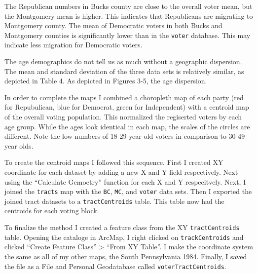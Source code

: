 \documentclass[]{article}
\begin{document}
The Republican numbers in Bucks county are close to the overall voter
mean, but the Montgomery mean is higher. This indicates that Republicans
are migrating to Montgomery county. The mean of Democratic voters in
both Bucks and Montgomery counties is significantly lower than in the
\texttt{voter} database. This may indicate less migration for Democratic
voters.

The age demographics do not tell us as much without a geographic
dispersion. The mean and standard deviation of the three data sets is
relatively similar, as depicted in Table 4. As depicted in Figures 3-5,
the age dispersion.

In order to complete the maps I combined a choropleth map of each party
(red for Repubulican, blue for Democrat, green for Independent) with a
centroid map of the overall voting population. This normalized the
regiserted voters by each age group. While the ages look identical in
each map, the scales of the circles are different. Note the low numbers
of 18-29 year old voters in comparison to 30-49 year olds.

To create the centroid maps I followed this sequence. First I created XY
coordinate for each dataset by adding a new X and Y field respectively.
Next using the ``Calculate Gemoetry'' function for each X and Y
respecitvely. Next, I joined the \texttt{tracts} map with the
\texttt{BC}, \texttt{MC}, and \texttt{voter} data sets. Then I exported
the joined tract datasets to a \texttt{tractCentroids} table. This table
now had the centroids for each voting block.

To finalize the method I created a feature class from the XY
\texttt{tractCentroids} table. Opening the cataloge in ArcMap, I right
clicked on \texttt{trackCentroids} and clicked ``Create Feature Class''
\textgreater{} ``From XY Table''. I make the coordinate system the same
as all of my other maps, the South Pennsylvania 1984. Finally, I saved
the file as a File and Personal Geodatabase called
\texttt{voterTractCentroids}.
\end{document}

